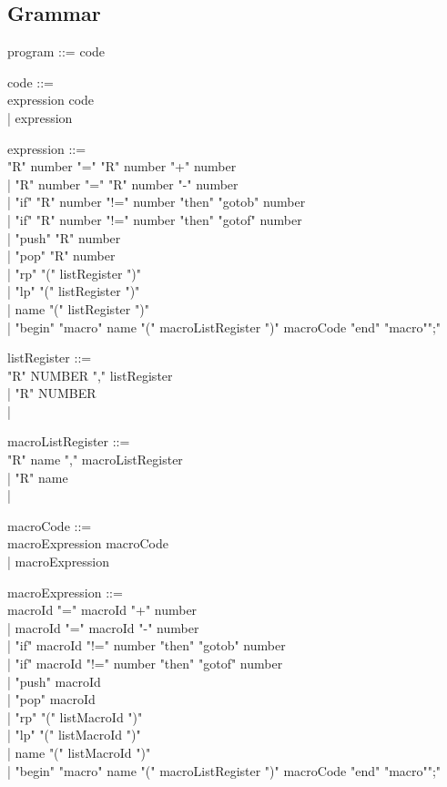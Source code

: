 \appendix

\begin{appendices}

\section{Grammar}
\label{grammar}

program ::= code
 
code ::= \\
\tab expression code \\
\tab | expression \


expression ::= \\
\tab "R" number "=" "R" number "+" number \\
\tab | "R" number "=" "R" number "-" number \\
\tab | "if" "R" number "!=" number "then" "gotob" number \\
\tab | "if" "R" number "!=" number "then" "gotof" number \\
\tab | "push" "R" number \\
\tab | "pop" "R" number \\
\tab | "rp" "(" listRegister ")" \\
\tab | "lp" "(" listRegister ")" \\
\tab | name "(" listRegister ")" \\
\tab | "begin" "macro" name "(" macroListRegister ")" macroCode "end" "macro"";" 

listRegister ::= \\
\tab "R" NUMBER "," listRegister \\
\tab | "R" NUMBER \\
\tab | 

macroListRegister ::= \\
\tab "R" name "," macroListRegister \\
\tab | "R" name \\
\tab | 

macroCode ::= \\
\tab macroExpression macroCode \\
\tab | macroExpression 

macroExpression ::= \\
\tab macroId "=" macroId "+" number \\
\tab | macroId "=" macroId "-" number \\
\tab | "if" macroId "!=" number "then" "gotob" number \\
\tab | "if" macroId "!=" number "then" "gotof" number \\
\tab | "push" macroId \\
\tab | "pop" macroId \\
\tab | "rp" "(" listMacroId ")" \\
\tab | "lp" "(" listMacroId ")" \\
\tab | name "(" listMacroId ")" \\
\tab | "begin" "macro" name "(" macroListRegister ")" macroCode "end" "macro"";" 


\end{appendices}
